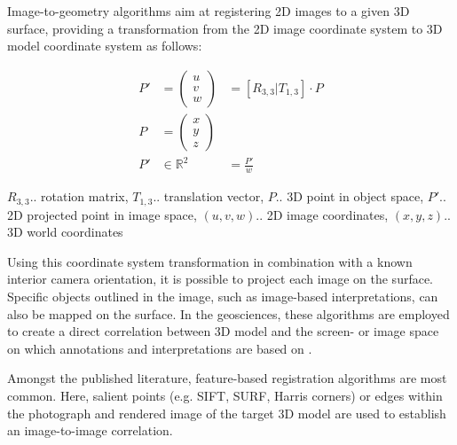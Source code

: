 \documentclass[review]{elsarticle}
\begin{document}

Image-to-geometry algorithms aim at registering 2D images to a given 3D surface, providing a transformation from the 2D image coordinate system to 3D model coordinate system as follows:

\begin{eqnarray}
\label{eq:i2g:projection}
P' &= \begin{pmatrix}
u \\ v \\ w
\end{pmatrix} &= [ R_{3,3} | T_{1,3} ] \cdot P \\
P &= \begin{pmatrix}
x \\ y \\ z
\end{pmatrix} & \\
P' &\in \mathds{R}^2 &= \frac{P'}{w}
\end{eqnarray}

\begin{center}
$R_{3,3}$.. rotation matrix, $T_{1,3}$.. translation vector, $P$.. 3D point in object space, $P'$.. 2D projected point in image space, $(u,v,w)$.. 2D image coordinates, $(x,y,z)$.. 3D world coordinates
\end{center}


Using this coordinate system transformation in combination with a known interior camera orientation, it is possible to project each image on the surface. Specific objects outlined in the image, such as image-based interpretations, can also be mapped on the surface. In the geosciences, these algorithms are employed to create a direct correlation between 3D model and the screen- or image space on which annotations and interpretations are based on \cite{Kehl2016_ISPRS}.

Amongst the published literature, feature-based registration algorithms are most common. Here, salient points (e.g. SIFT, SURF, Harris corners) or edges within the photograph and rendered image of the target 3D model are used to establish an image-to-image correlation. 
\end{document}
